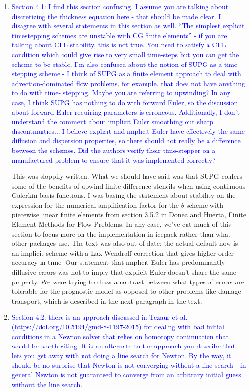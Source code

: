 \documentclass{article}
\theoremstyle{definition}
\theoremstyle{plain}
\begin{document}
\begin{enumerate}
\item \textcolor{blue}{Section 4.1: I find this section confusing. I assume you are talking about discretizing the thickness
equation here - that should be made clear. I disagree with several statements in this section as
well. ``The simplest explicit timestepping schemes are unstable with CG finite elements'' - if you are
talking about CFL stability, this is not true. You need to satisfy a CFL condition which could give
rise to very small time-steps but you can get the scheme to be stable. I'm also confused about the
notion of SUPG as a time-stepping scheme - I think of SUPG as a finite element approach to deal
with advection-dominated flow problems, for example, that does not have anything to do with time-
stepping. Maybe you are referring to upwinding? In any case, I think SUPG has nothing to do with
forward Euler, so the discussion about forward Euler requiring parameters is erroneous. Additionally,
I don't understand the comment about implicit Euler smoothing out sharp discontinuities... I believe
explicit and implicit Euler have effectively the same diffusion and dispersion properties, so there
should not really be a difference between the schemes. Did the authors verify their time-stepper on
a manufactured problem to ensure that it was implemented correctly?}

This was sloppily written.
What we should have said was that SUPG confers some of the benefits of upwind finite difference stencils when using continuous Galerkin basis functions.
I was basing the statement about stability on the expression for the numerical amplification factor for the $\theta$-scheme with piecewise linear finite elements from section 3.5.2 in Donea and Huerta, Finite Element Methods for Flow Problems.
In any case, we've cut much of this section to focus more on the implementation in icepack rather than what other packages use.
The text was also out of date; the actual default now is an implicit scheme with a Lax-Wendroff correction that gives higher order accuracy in time.
Our statement that implicit Euler has predominantly diffusive errors was not to imply that explicit Euler doesn't share the same property.
We were trying to draw a contrast between what types of errors are tolerable for the prognostic model as opposed to other problems like damage transport, which is described in the next paragraph in the text.

\item \textcolor{blue}{Section 4.2: there is an approach discussed in Tezaur et al. (https://doi.org/10.5194/gmd-8-1197-2015)
for dealing with bad initial conditions in a Newton solver that relies on homotopy continuation that
would be worth citing. It is an alternate to the approach you describe that lets you get away with not
doing a line search for Newton. By the way, it should be no surprise that Newton is not converging
without a line search - in general Newton is not guaranteed to converge from an arbitrary initial
guess without the line search.}


\end{enumerate}
\end{document}
